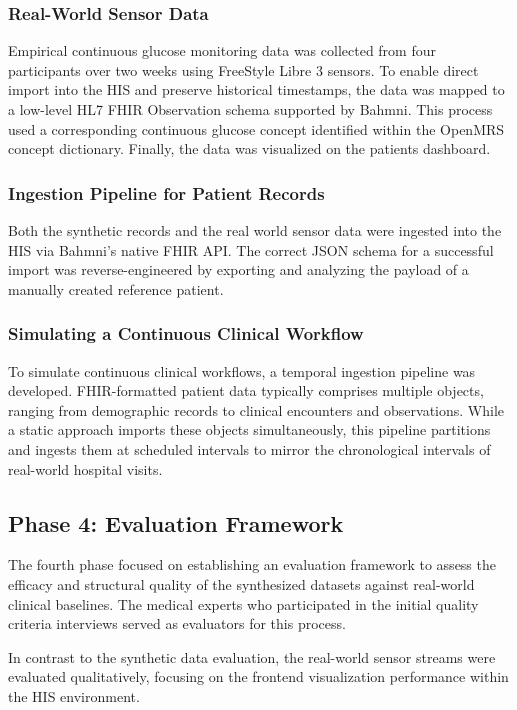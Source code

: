 \subsubsection*{Real-World Sensor Data}
\begin{sloppypar}
Empirical continuous glucose monitoring data was collected from four participants over two weeks using FreeStyle Libre 3 \citep{FreeStyle_Libre_3} sensors. To enable direct import into the HIS and preserve historical timestamps, the data was mapped to a low-level HL7 FHIR Observation schema supported by Bahmni. This process used a corresponding continuous glucose concept identified within the OpenMRS concept dictionary. Finally, the data was visualized on the patients dashboard.
\end{sloppypar}

\subsubsection*{Ingestion Pipeline for Patient Records}
Both the synthetic records and the real world sensor data were ingested into the HIS via Bahmni's native FHIR API. The correct JSON schema for a successful import was reverse-engineered by exporting and analyzing the payload of a manually created reference patient.

\subsubsection*{Simulating a Continuous Clinical Workflow}
To simulate continuous clinical workflows, a temporal ingestion pipeline was developed. FHIR-formatted patient data typically comprises multiple objects, ranging from demographic records to clinical encounters and observations. While a static approach imports these objects simultaneously, this pipeline partitions and ingests them at scheduled intervals to mirror the chronological intervals of real-world hospital visits.

\subsection*{Phase 4: Evaluation Framework}
The fourth phase focused on establishing an evaluation framework to assess the efficacy and structural quality of the synthesized datasets against real-world clinical baselines. The medical experts who participated in the initial quality criteria interviews served as evaluators for this process.

In contrast to the synthetic data evaluation, the real-world sensor streams were evaluated qualitatively, focusing on the frontend visualization performance within the HIS environment.

